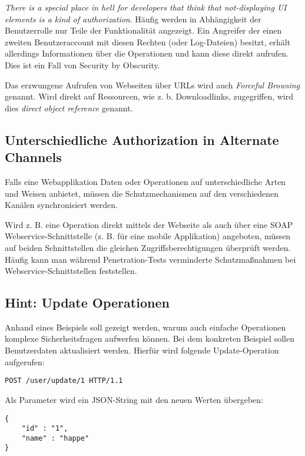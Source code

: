\textit{There is a special place in hell for developers that think that not-displaying UI elements is a kind of authorization}. Häufig werden in Abhängigkeit der Benutzerrolle nur Teile der Funktionalität angezeigt. Ein Angreifer der einen zweiten Benutzeraccount mit diesen Rechten (oder Log-Dateien) besitzt, erhält allerdings Informationen über die Operationen und kann diese direkt aufrufen. Dies ist ein Fall von Security by Obscurity.

Das erzwungene Aufrufen von Webseiten über URLs wird auch \textit{Forceful Browsing} genannt. Wird direkt auf Ressourcen, wie z. b. Downloadlinks, zugegriffen, wird dies \textit{direct object reference} genannt.

\subsection{Unterschiedliche Authorization in Alternate Channels}

Falls eine Webapplikation Daten oder Operationen auf unterschiedliche Arten und Weisen anbietet, müssen die Schutzmechanismen auf den verschiedenen Kanälen synchronisiert werden.

Wird z. B. eine Operation direkt mittels der Webseite als auch über eine SOAP Webservice-Schnittstelle (z. B. für eine mobile Applikation) angeboten, müssen auf beiden Schnittstellen die gleichen Zugriffsberechtigungen überprüft werden. Häufig kann man während Penetration-Tests verminderte Schutzmaßnahmen bei Webservice-Schnittstellen feststellen.

\subsection{Hint: Update Operationen}

Anhand eines Beispiels soll gezeigt werden, warum auch einfache Operationen komplexe Sicherheitsfragen aufwerfen können. Bei dem konkreten Beispiel sollen Benutzerdaten aktualisiert werden. Hierfür wird folgende Update-Operation aufgerufen:

\begin{verbatim}
POST /user/update/1 HTTP/1.1
\end{verbatim}

Als Parameter wird ein JSON-String mit den neuen Werten übergeben:

\begin{verbatim}
{
	"id" : "1",
	"name" : "happe"
}
\end{verbatim}

